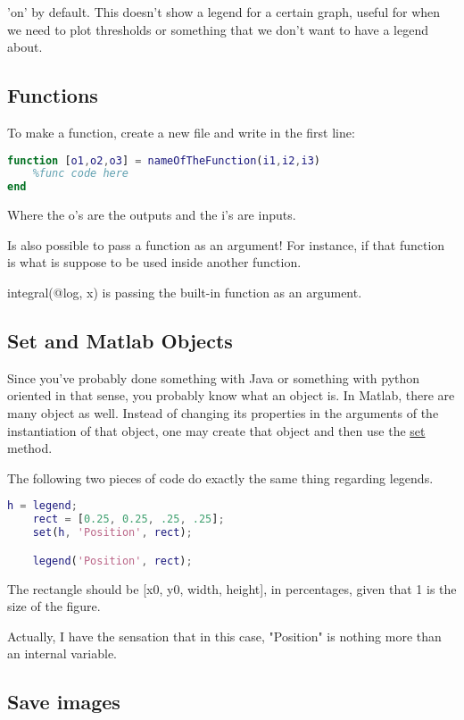  'on' by default. This doesn't show a legend for a certain graph, useful for when we need to plot thresholds or something that we don't want to have a legend about.


\subsection{Functions}

To make a function, create a new file and write in the first line:

\begin{lstlisting}[language=matlab]
function [o1,o2,o3] = nameOfTheFunction(i1,i2,i3) 
    %func code here
end
\end{lstlisting}
Where the o's are the outputs and the i's are inputs.

Is also possible to pass a function as an argument! For instance, if that function is what is suppose to be used inside another function.

integral(@log, x) is passing the built-in function  as an argument. 

\subsection{Set and Matlab Objects}
Since you've probably done something with Java or something with python oriented in that sense, you probably know what an object is. In Matlab, there are many object as well. Instead of changing its properties in the arguments of the instantiation of that object, one may create that object and then use the \uline{set} method.

The following two pieces of code do exactly the same thing regarding legends.

\begin{lstlisting}[language=Matlab]
    h = legend;
    rect = [0.25, 0.25, .25, .25];
    set(h, 'Position', rect);

    legend('Position', rect);
\end{lstlisting}

The rectangle should be [x0, y0, width, height], in percentages, given that 1 is the size of the figure.



Actually, I have the sensation that in this case, "Position" is nothing more than an internal variable.


\subsection{Save images}

